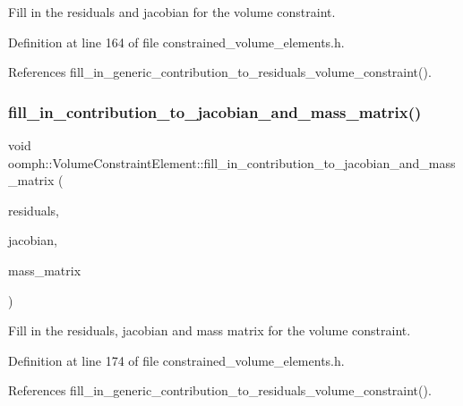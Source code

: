 Fill in the residuals and jacobian for the volume constraint. 



Definition at line 164 of file constrained\+\_\+volume\+\_\+elements.\+h.



References fill\+\_\+in\+\_\+generic\+\_\+contribution\+\_\+to\+\_\+residuals\+\_\+volume\+\_\+constraint().

\mbox{\label{classoomph_1_1VolumeConstraintElement_af2a5a59f7fa5f2570d2d490f3610de61}} 
\subsubsection{\texorpdfstring{fill\+\_\+in\+\_\+contribution\+\_\+to\+\_\+jacobian\+\_\+and\+\_\+mass\+\_\+matrix()}{fill\_in\_contribution\_to\_jacobian\_and\_mass\_matrix()}}
{\footnotesize\ttfamily void oomph\+::\+Volume\+Constraint\+Element\+::fill\+\_\+in\+\_\+contribution\+\_\+to\+\_\+jacobian\+\_\+and\+\_\+mass\+\_\+matrix (\begin{DoxyParamCaption}\item[{Vector$<$ double $>$ \&}]{residuals,  }\item[{Dense\+Matrix$<$ double $>$ \&}]{jacobian,  }\item[{Dense\+Matrix$<$ double $>$ \&}]{mass\+\_\+matrix }\end{DoxyParamCaption})\hspace{0.3cm}{\ttfamily [inline]}}



Fill in the residuals, jacobian and mass matrix for the volume constraint. 



Definition at line 174 of file constrained\+\_\+volume\+\_\+elements.\+h.



References fill\+\_\+in\+\_\+generic\+\_\+contribution\+\_\+to\+\_\+residuals\+\_\+volume\+\_\+constraint().

